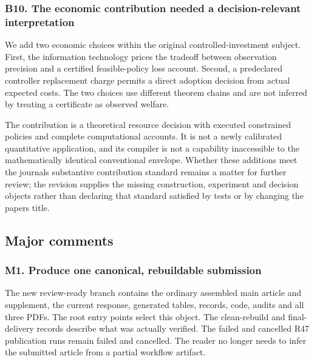 \documentclass[ecta,nameyear,draft]{econsocart}
\begin{document}
\hypertarget{b10-the-economic-contribution-needed-a-decision-relevant-interpretation}{%
\subsubsection{B10. The economic contribution needed a decision-relevant
interpretation}\label{b10-the-economic-contribution-needed-a-decision-relevant-interpretation}}

We add two economic choices within the original controlled-investment
subject. First, the information technology prices the tradeoff between
observation precision and a certified feasible-policy loss account.
Second, a predeclared controller replacement charge permits a direct
adoption decision from actual expected costs. The two choices use
different theorem chains and are not inferred by treating a certificate
as observed welfare.

The contribution is a theoretical resource decision with executed
constrained policies and complete computational accounts. It is not a
newly calibrated quantitative application, and its compiler is not a
capability inaccessible to the mathematically identical conventional
envelope. Whether these additions meet the journal\textquotesingle s
substantive contribution standard remains a matter for further review;
the revision supplies the missing construction, experiment and decision
objects rather than declaring that standard satisfied by tests or by
changing the paper\textquotesingle s title.

\hypertarget{major-comments}{%
\subsection{Major comments}\label{major-comments}}

\hypertarget{m1-produce-one-canonical-rebuildable-submission}{%
\subsubsection{M1. Produce one canonical, rebuildable
submission}\label{m1-produce-one-canonical-rebuildable-submission}}

The new review-ready branch contains the ordinary assembled main article
and supplement, the current response, generated tables, records, code,
audits and all three PDFs. The root entry points select this object. The
clean-rebuild and final-delivery records describe what was actually
verified. The failed and cancelled R47 publication runs remain failed
and cancelled. The reader no longer needs to infer the submitted article
from a partial workflow artifact.
\end{document}

